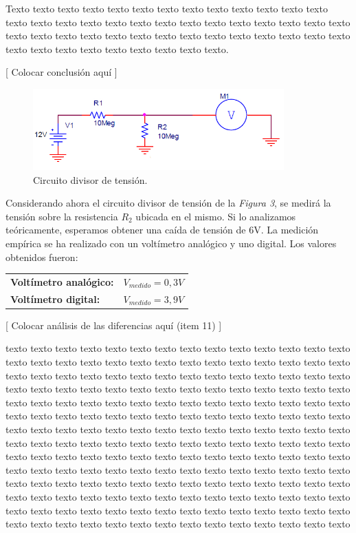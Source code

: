 \documentclass{article}
\begin{document}
	Texto texto texto texto texto texto texto texto texto texto texto texto texto texto texto texto texto texto texto texto texto texto texto texto texto texto texto texto texto texto texto texto texto texto texto texto texto texto texto texto texto texto texto texto texto texto texto texto texto texto.
\bigskip


[ Colocar conclusión aquí ]
\bigskip


\begin{figure}[h]
	\centering
	\includegraphics[width=0.86\textwidth]{images/p1-item-8.jpg}
	\caption{Circuito divisor de tensión.}
\end{figure}
\bigskip


	Considerando ahora el circuito divisor de tensión de la \textit{Figura 3}, se medirá la tensión sobre la resistencia $R_2$ ubicada en el mismo. Si lo analizamos teóricamente, esperamos obtener una caída de tensión de 6V. La medición empírica se ha realizado con un voltímetro analógico y uno digital. Los valores obtenidos fueron:
\bigskip\medskip

\begin{tabular}{l l}
	\textbf{Voltímetro analógico:} & $V_{medido} = 0,3V$ \smallskip\\
	\textbf{Voltímetro digital:} & $V_{medido} = 3,9V$ \\
\end{tabular}
\bigskip\bigskip

[ Colocar análisis de las diferencias aquí (item 11) ]

texto texto texto texto texto texto texto texto texto texto texto texto texto texto texto texto texto texto texto texto texto texto texto texto texto texto texto texto texto texto texto texto texto texto texto texto texto texto texto texto texto texto texto texto texto texto texto texto texto texto texto texto texto texto texto texto texto texto texto texto texto texto texto texto texto texto texto texto texto texto texto texto texto texto texto texto texto texto texto texto texto texto texto texto texto texto texto texto texto texto texto texto texto texto texto texto texto texto texto texto texto texto texto texto texto texto texto texto texto texto texto texto texto texto texto texto texto texto texto texto texto texto texto texto texto texto texto texto texto texto texto texto texto texto texto texto texto texto texto texto texto texto texto texto texto texto texto texto texto texto texto texto texto texto texto texto texto texto texto texto texto texto texto texto texto texto texto texto texto texto texto texto texto texto texto texto texto texto texto texto texto texto texto texto texto texto texto texto texto texto texto texto texto texto texto texto 
\end{document}
